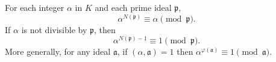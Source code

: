 For each integer $\alpha$ in $K$ and each prime ideal $\mathfrak{p}$,
$$\alpha^{N(\mathfrak{p})} \equiv \alpha \pmod{\mathfrak{p}}.$$
If $\alpha$ is not divisible by $\mathfrak{p}$, then
$$\alpha^{N(\mathfrak{p})-1} \equiv 1 \pmod{\mathfrak{p}}.$$
More generally, for any ideal $\mathfrak{a}$, if $(\alpha, \mathfrak{a}) = 1$ then $\alpha^{\varphi(\mathfrak{a})} \equiv 1 \pmod{\mathfrak{a}}$.
